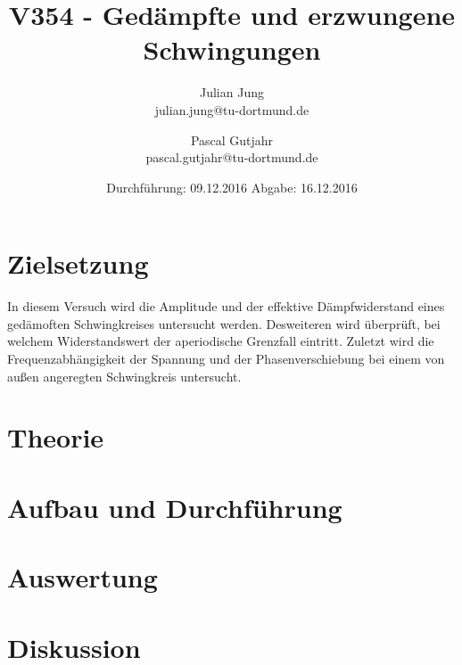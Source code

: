 

\title{V354 - Gedämpfte und erzwungene Schwingungen}
\author{Julian Jung \\ julian.jung@tu-dortmund.de
  \and Pascal Gutjahr \\ pascal.gutjahr@tu-dortmund.de}
  \date{Durchführung: 09.12.2016
  \hspace{3em}
  Abgabe: 16.12.2016}
  
\maketitle
\newpage
\tableofcontents
\newpage
\section{Zielsetzung}
In diesem Versuch wird die Amplitude und der effektive Dämpfwiderstand eines
gedämoften Schwingkreises untersucht werden. Desweiteren wird überprüft, bei
welchem Widerstandswert der aperiodische Grenzfall eintritt. Zuletzt wird die
Frequenzabhängigkeit der Spannung und der Phasenverschiebung bei einem von
außen angeregten Schwingkreis untersucht.
\section{Theorie}
 
\section{Aufbau und Durchführung}
 
\section{Auswertung}
\section{Diskussion}
\printbibliography

